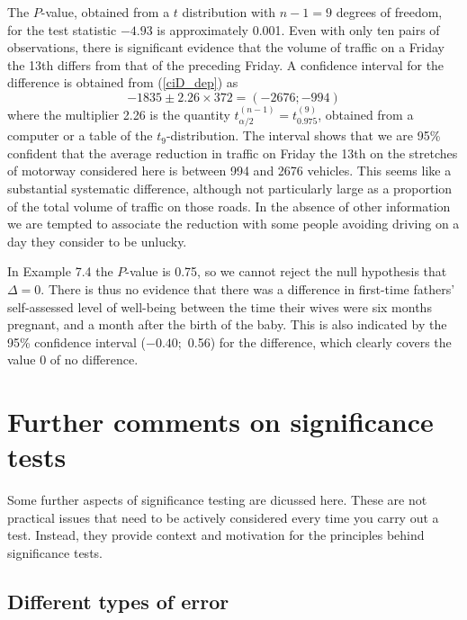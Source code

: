 The $P$-value, obtained from a $t$ distribution with $n-1=9$ degrees of
freedom, for the test statistic $-4.93$ is approximately 0.001. Even
with only ten pairs of observations, there is
significant evidence that the volume of traffic on a
Friday the 13th differs from that of the preceding Friday. A confidence
interval for the difference is obtained from (\ref{ciD_dep})
as
\[
-1835 \pm 2.26 \times 372 = (-2676; -994)
\]
where the multiplier 2.26 is the quantity
$t_{\alpha/2}^{(n-1)}=t_{0.975}^{(9)}$, obtained from a computer or a
table of the $t_{9}$-distribution. The interval shows that we are 95\%
confident that the average reduction in traffic on Friday the 13th on
the stretches of motorway considered here is between 994 and 2676
vehicles. This seems like a substantial systematic difference, although
not particularly large as a proportion of the total volume of traffic on
those roads. In the absence of other information we are tempted to
associate the reduction with some people avoiding driving on a day they
consider to be unlucky.

In Example 7.4 the $P$-value is 0.75, so we cannot reject the null
hypothesis that $\Delta=0$. There is thus no evidence that there was a
difference in first-time fathers' self-assessed level of well-being
between the time their wives were six months pregnant, and a month after
the birth of the baby. This is also indicated by the 95\% confidence
interval \mbox{($-0.40$; 0.56)} for the difference, which clearly covers the
value 0 of no difference.

\section{Further comments on significance tests}
\label{s_means_tests3}

Some further aspects of significance
testing are dicussed here. These are not practical issues that need to
be actively considered every time you carry out a test. Instead, they provide
context and motivation for the principles behind significance tests.

\subsection{Different types of error}
\label{ss_means_tests3_errors}

